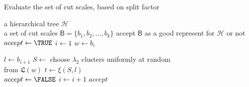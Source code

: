 \vspace{-4mm}
\begin{algorithm}[h!]
\caption{Evaluate the set of cut scales, based on split factor}\label{alg:evaluate}
\begin{algorithmic}[1]
	\REQUIRE a hierarchical tree $\mathcal{H}$ \AND \\
             \hspace{8 mm} a set of cut scales $\textit{$\mathsf{B}$} = \{b_1, b_2, \ldots, b_k\}$
	\ENSURE accept \textit{$\mathsf{B}$} as a good represent for $\mathcal{H}$ or not
	\medskip
	\STATE $accept \leftarrow \TRUE$ 
	\STATE $i \leftarrow 1$
		\vspace{0.8mm}
		\STATE $w \leftarrow b_i$

		\STATE $l \leftarrow b_{i+1}$
		\vspace{1.mm}
		\STATE $ S \leftarrow$ choose $\lambda_2$ clusters uniformly at random \\
								\hspace{8mm} from $\mathfrak{L}$$(w)$
		\vspace{1.mm}
		\STATE $t \leftarrow \xi(S,l)$ \\
		\vspace{1.mm}
			\vspace{0.8mm}	
			\STATE $accept \leftarrow \FALSE$ 
		\ENDIF
		\vspace{0.9mm}
		\STATE $i \leftarrow i+1$\;	
	\ENDWHILE
	\vspace{0.9mm}
	\RETURN $accept$
\end{algorithmic}
\end{algorithm}
